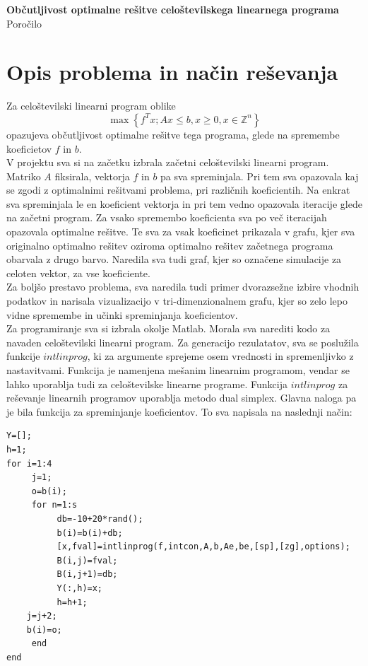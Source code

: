 \documentclass[a4paper,12pt]{article}
\begin{document}
\begin{center}
\huge \textbf{Občutljivost optimalne rešitve celoštevilskega linearnega programa}
\\[2cm]
\LARGE Poročilo
\\[2cm]
\end{center}


\section{Opis problema in način reševanja}


Za celoštevilski linearni program oblike
$$\max\left\{f^Tx; Ax \leq b, x \geq 0, x \in \mathbb{Z}^n \right\}$$
opazujeva občutljivost optimalne rešitve tega programa, glede na spremembe koeficietov $f$ in $b$. 
\\[0.5cm]
V projektu sva si na začetku izbrala začetni celoštevilski linearni program. Matriko $A$ fiksirala, vektorja $f$ in $b$ pa sva spreminjala. Pri tem sva opazovala kaj se zgodi z optimalnimi rešitvami problema, pri različnih koeficientih. Na enkrat sva spreminjala le en koeficient vektorja in pri tem vedno opazovala iteracije glede na začetni program. Za vsako spremembo koeficienta sva po več iteracijah opazovala optimalne rešitve. Te sva za vsak koeficinet prikazala v grafu, kjer sva originalno optimalno rešitev oziroma optimalno rešitev začetnega programa obarvala z drugo barvo. Naredila sva tudi graf, kjer so označene simulacije za celoten vektor, za vse koeficiente.
\\[0.5cm]
Za boljšo prestavo problema, sva naredila tudi primer dvorazsežne izbire vhodnih podatkov in narisala vizualizacijo v tri-dimenzionalnem grafu, kjer so zelo lepo vidne spremembe in učinki spreminjanja koeficientov.
\\[1cm]
Za programiranje sva si izbrala okolje Matlab. Morala sva narediti kodo za navaden celoštevilski linearni program. Za generacijo rezulatatov, sva se poslužila funkcije $intlinprog$, ki za argumente sprejeme osem vrednosti in spremenljivko z nastavitvami. Funkcija je namenjena mešanim linearnim programom, vendar se lahko uporablja tudi za celoštevilske linearne programe. Funkcija $intlinprog$ za reševanje linearnih programov uporablja metodo dual simplex. Glavna naloga pa je bila funkcija za spreminjanje koeficientov. To sva napisala na naslednji način:
\newpage
\lstset{language=Matlab} 
\begin{lstlisting}
Y=[];
h=1;
for i=1:4
     j=1;
     o=b(i);
     for n=1:s
          db=-10+20*rand();
          b(i)=b(i)+db;
          [x,fval]=intlinprog(f,intcon,A,b,Ae,be,[sp],[zg],options);
          B(i,j)=fval;
          B(i,j+1)=db;
          Y(:,h)=x;
          h=h+1;
	j=j+2;
	b(i)=o;
     end
end
\end{lstlisting}
\end{document}
